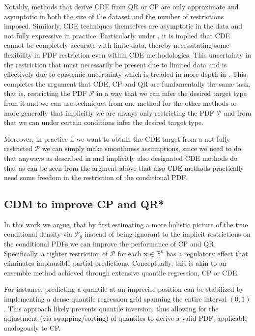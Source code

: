 Notably, methods that derive CDE from QR or CP are only approximate and asymptotic in both the size of the dataset and the number of restrictions imposed. Similarly, CDE techniques themselves are asymptotic in the data and not fully expressive in practice. Particularly under , it is implied that CDE cannot be completely accurate with finite data, thereby necessitating some flexibility in PDF restriction even within CDE methodologies. This uncertainty in the restriction that must necessarily be present due to limited data and  is effectively due to epistemic uncertainty which is treaded in more depth in . This completes the argument that CDE, CP and QR are fundamentally the same task, that is, restricting the PDF $\mathcal{P}$ in a way that we can infer the desired target type from it and we can use techniques from one method for the other methods or more generally that implicitly we are always only restricting the PDF $\mathcal{P}$ and from that we can under certain conditions infer the desired target type.

Moreover, in practice if we want to obtain the CDE target from a not fully restricted $\mathcal{P}$ we can simply make smoothness assumptions, since we need to do that anyways as described in  and implicitly also designated CDE methods do that as can be seen from the argment above that also CDE methods practically need some freedom in the restriction of the conditional PDF.

\subsection{CDM to improve CP and QR*}
In this work we argue, that by first estimating a more holistic picture of the true conditional density via $\mathscr{P}_\theta$ instead of being ignorant to the implicit restrictions on the conditional PDFs we can improve the performance of CP and QR. Specifically, a tighter restriction of $\mathcal{P}$ for each $\mathbf{x}\in\mathbb{R}^n$ has a regulatory effect that eliminates implausible partial predictions. Conceptually, this is akin to an ensemble method achieved through extensive quantile regression, CP or CDE.

For instance, predicting a quantile at an imprecise position can be stabilized by implementing a dense quantile regression grid spanning the entire interval $(0,1)$. This approach likely prevents quantile inversion, thus allowing for the adjustment (via swapping/sorting) of quantiles to derive a valid PDF, applicable analogously to CP.

